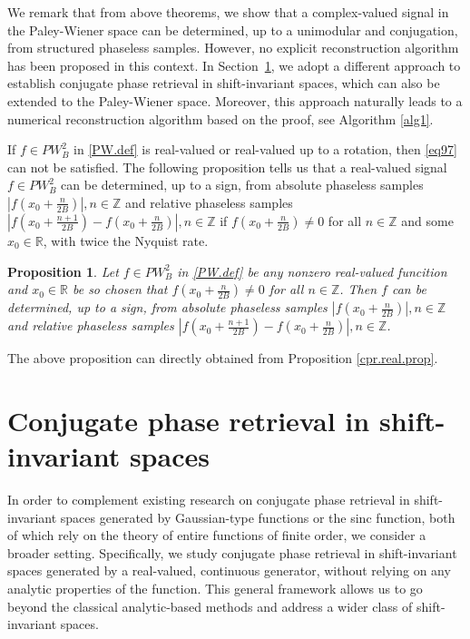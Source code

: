 \documentclass[12pt,oneside,reqno]{amsart}
\newtheorem{proposition}[theorem]{Proposition}%
\newcommand{\Z}{\mathbb{Z}}
\newcommand{\R}{\mathbb{R}}
\numberwithin{equation}{section}
\begin{document}
We remark that from above theorems, we show that a complex-valued signal in the Paley-Wiener space can be determined, up to a unimodular and conjugation, from structured phaseless samples. However, no explicit reconstruction algorithm has been proposed in this context. In Section~\ref{cpr.sis.sec}, we adopt a different approach to establish conjugate phase retrieval in shift-invariant spaces, which can also be extended to the Paley-Wiener space. Moreover, this approach naturally leads to a numerical reconstruction algorithm based on the proof, see Algorithm \ref{alg1}. 


If $f\in PW_B^2$ in \eqref{PW.def} is real-valued or real-valued up to a rotation, then \eqref{eq97} can not be satisfied. The following proposition tells us that  a real-valued signal $f\in PW_B^2$ can be determined, up to a sign,  from absolute phaseless samples $ |f(x_0 + \frac{n}{2B})|, n\in \Z$ and relative phaseless samples $|f(x_0 + \frac{n+1}{2B}) - f(x_0 + \frac{n}{2B})|, n\in \Z$ if  $f(x_0 + \frac{n}{2B})\ne 0$ for all $n\in \Z$ and some $x_0\in \R$, with twice the Nyquist rate.

\begin{proposition}\label{cpr.real.PW.prop}
Let $f\in PW_B^2$ in \eqref{PW.def} be any nonzero real-valued funcition and $x_0\in \R$ be so chosen  that $f(x_0 + \frac{n}{2B})\ne 0$ for all $n\in \Z$. Then $f$ can be determined, up to a sign, from absolute phaseless samples $ |f(x_0 + \frac{n}{2B})|, n\in \Z$ and relative phaseless samples $|f(x_0 + \frac{n+1}{2B}) - f(x_0 + \frac{n}{2B})|, n\in \Z$. 
\end{proposition}

The above proposition can directly obtained from Proposition \ref{cpr.real.prop}. 



\section{Conjugate phase retrieval in shift-invariant spaces}\label{cpr.sis.sec}







In order to complement existing research on conjugate phase retrieval in shift-invariant spaces generated by Gaussian-type functions or the sinc function, both of which rely on the theory of entire functions of finite order, we consider a broader setting. Specifically, we study conjugate phase retrieval in shift-invariant spaces generated by a real-valued, continuous generator, without relying on any analytic properties of the function. This general framework allows us to go beyond the classical analytic-based methods and address a wider class of shift-invariant spaces.  
\end{document}
